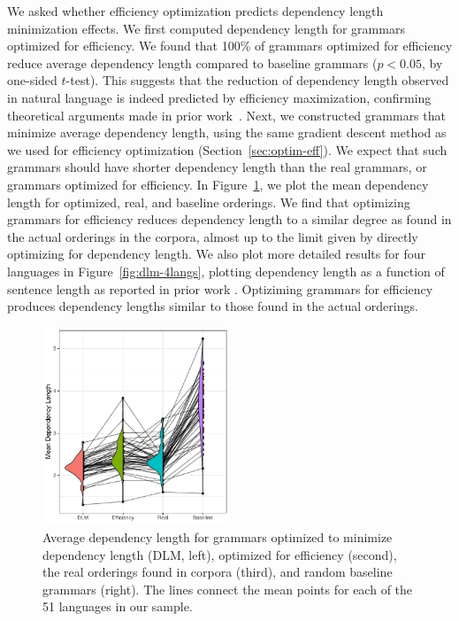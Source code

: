 \documentclass[10pt,twoside,lineno]{article}
\begin{document}
We asked whether efficiency optimization predicts dependency length minimization effects.
We first computed dependency length for grammars optimized for efficiency.
We found that 100\% of grammars optimized for efficiency reduce average dependency length compared to baseline grammars ($p < 0.05$, by one-sided $t$-test). 
This suggests that the reduction of dependency length observed in natural language is indeed predicted by efficiency maximization, confirming theoretical arguments made in prior work~\cite{rijkhoff1986word,rijkhoff1990explaining,hawkins1994performance,hawkins2004efficiency,futrell2017memory, futrell2017generalizing}.
Next, we constructed grammars that minimize average dependency length, using the same gradient descent method as we used for efficiency optimization (Section~\ref{sec:optim-eff}).
We expect that such grammars should have shorter dependency length than the real grammars, or grammars optimized for efficiency.
In Figure~\ref{fig:dlm-avg}, we plot the mean dependency length for optimized, real, and baseline orderings.
We find that optimizing grammars for efficiency reduces dependency length to a similar degree as found in the actual orderings in the corpora, almost up to the limit given by directly optimizing for dependency length. %
We also plot more detailed results for four languages in Figure~\ref{fig:dlm-4langs}, plotting dependency length as a function of sentence length as reported in prior work \cite{futrell2015largescale}.
Optiziming grammars for efficiency produces dependency lengths similar to those found in the actual orderings.

\begin{figure}[ht]
    \centering
     \includegraphics[width=0.5\textwidth]{depl-violin-all-1.png} 
        \caption{Average dependency length for grammars optimized to minimize dependency length (DLM, left), optimized for efficiency (second), the real orderings found in corpora (third), and random baseline grammars (right). The lines connect the mean points for each of the 51 languages in our sample.}
    \label{fig:dlm-avg}
\end{figure}
\end{document}
